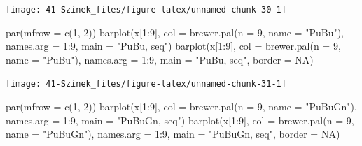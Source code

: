 \documentclass[
]{book}
\newenvironment{Shaded}{\begin{snugshade}}{\end{snugshade}}
\newcommand{\AttributeTok}[1]{\textcolor[rgb]{0.77,0.63,0.00}{#1}}
\newcommand{\ConstantTok}[1]{\textcolor[rgb]{0.00,0.00,0.00}{#1}}
\newcommand{\DecValTok}[1]{\textcolor[rgb]{0.00,0.00,0.81}{#1}}
\newcommand{\FunctionTok}[1]{\textcolor[rgb]{0.00,0.00,0.00}{#1}}
\newcommand{\NormalTok}[1]{#1}
\newcommand{\SpecialCharTok}[1]{\textcolor[rgb]{0.00,0.00,0.00}{#1}}
\newcommand{\StringTok}[1]{\textcolor[rgb]{0.31,0.60,0.02}{#1}}
\begin{document}
\begin{center}\texttt{[image: 41-Szinek\_files/figure-latex/unnamed-chunk-30-1]} \end{center}

\begin{Shaded}
\begin{Highlighting}[]
\FunctionTok{par}\NormalTok{(}\AttributeTok{mfrow =} \FunctionTok{c}\NormalTok{(}\DecValTok{1}\NormalTok{, }\DecValTok{2}\NormalTok{))}
\FunctionTok{barplot}\NormalTok{(x[}\DecValTok{1}\SpecialCharTok{:}\DecValTok{9}\NormalTok{], }\AttributeTok{col =} \FunctionTok{brewer.pal}\NormalTok{(}\AttributeTok{n =} \DecValTok{9}\NormalTok{, }\AttributeTok{name =} \StringTok{"PuBu"}\NormalTok{), }\AttributeTok{names.arg =} \DecValTok{1}\SpecialCharTok{:}\DecValTok{9}\NormalTok{, }\AttributeTok{main =} \StringTok{"PuBu, seq"}\NormalTok{)}
\FunctionTok{barplot}\NormalTok{(x[}\DecValTok{1}\SpecialCharTok{:}\DecValTok{9}\NormalTok{], }\AttributeTok{col =} \FunctionTok{brewer.pal}\NormalTok{(}\AttributeTok{n =} \DecValTok{9}\NormalTok{, }\AttributeTok{name =} \StringTok{"PuBu"}\NormalTok{), }\AttributeTok{names.arg =} \DecValTok{1}\SpecialCharTok{:}\DecValTok{9}\NormalTok{, }\AttributeTok{main =} \StringTok{"PuBu, seq"}\NormalTok{, }
    \AttributeTok{border =} \ConstantTok{NA}\NormalTok{)}
\end{Highlighting}
\end{Shaded}

\begin{center}\texttt{[image: 41-Szinek\_files/figure-latex/unnamed-chunk-31-1]} \end{center}

\begin{Shaded}
\begin{Highlighting}[]
\FunctionTok{par}\NormalTok{(}\AttributeTok{mfrow =} \FunctionTok{c}\NormalTok{(}\DecValTok{1}\NormalTok{, }\DecValTok{2}\NormalTok{))}
\FunctionTok{barplot}\NormalTok{(x[}\DecValTok{1}\SpecialCharTok{:}\DecValTok{9}\NormalTok{], }\AttributeTok{col =} \FunctionTok{brewer.pal}\NormalTok{(}\AttributeTok{n =} \DecValTok{9}\NormalTok{, }\AttributeTok{name =} \StringTok{"PuBuGn"}\NormalTok{), }\AttributeTok{names.arg =} \DecValTok{1}\SpecialCharTok{:}\DecValTok{9}\NormalTok{, }\AttributeTok{main =} \StringTok{"PuBuGn, seq"}\NormalTok{)}
\FunctionTok{barplot}\NormalTok{(x[}\DecValTok{1}\SpecialCharTok{:}\DecValTok{9}\NormalTok{], }\AttributeTok{col =} \FunctionTok{brewer.pal}\NormalTok{(}\AttributeTok{n =} \DecValTok{9}\NormalTok{, }\AttributeTok{name =} \StringTok{"PuBuGn"}\NormalTok{), }\AttributeTok{names.arg =} \DecValTok{1}\SpecialCharTok{:}\DecValTok{9}\NormalTok{, }\AttributeTok{main =} \StringTok{"PuBuGn, seq"}\NormalTok{, }
    \AttributeTok{border =} \ConstantTok{NA}\NormalTok{)}
\end{Highlighting}
\end{Shaded}
\end{document}
